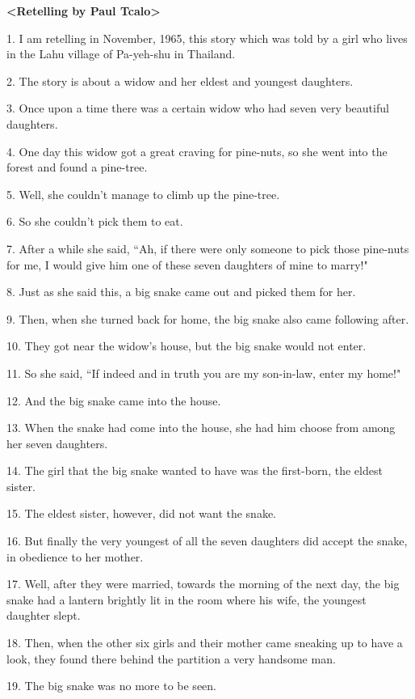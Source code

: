 \setcounter{footnote}{0}

\textbf{<Retelling by Paul Tcalo>}

1. I am retelling in November, 1965, this story which was told by a girl who lives
in the Lahu village of Pa-yeh-shu in Thailand.

2. The story is about a widow and her eldest and youngest daughters.

3. Once upon a time there was a certain widow who had seven very beautiful daughters.

4. One day this widow got a great craving for pine-nuts, so she went into the forest
and found a pine-tree.

5. Well, she couldn't manage to climb up the pine-tree.

6. So she couldn't pick them to eat.

7. After a while she said, ``Ah, if there were only someone to pick those
pine-nuts for me, I would give him one of these seven daughters of mine to marry!"

8. Just as she said this, a big snake came out and picked them for her.

9. Then, when she turned back for home, the big snake also came following after.

10. They got near the widow's house, but the big snake would not enter.

11. So she said, ``If indeed and in truth you are my son-in-law, enter
my home!"

12. And the big snake came into the house.

13. When the snake had come into the house, she had him choose from among her seven
daughters.

14. The girl that the big snake wanted to have was the first-born, the eldest sister.

15. The eldest sister, however, did not want the snake.

16. But finally the very youngest of all the seven daughters did accept the snake,
in obedience to her mother.

17. Well, after they were married, towards the morning of the next day, the big
snake had a lantern brightly lit in the room where his wife, the youngest daughter
slept.

18. Then, when the other six girls and their mother came sneaking up to have a
look, they found there behind the partition a very handsome man.

19. The big snake was no more to be seen.

